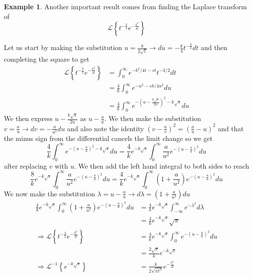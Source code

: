\documentclass{report}
\theoremstyle{definition}
\newtheorem{example}[theorem]{Example}
\theoremstyle{remark}
\newcommand{\lapt}[1]{\mathscr{L}\left\{ #1\right\}}
\newcommand{\inlt}[1]{\mathscr{L}^{-1} \left\{ #1 \right\}}
\begin{document}
\begin{example}
    Another important result comes from finding the Laplace transform of 
    \begin{equation*}
        \lapt{t^{-\frac{3}{2}}e^{-\frac{k^2}{4t}}}
    \end{equation*}
\end{example}
Let us start by making the substitution $u=\frac{k}{2\sqrt{t}} \rightarrow du =-\frac{k}{4}t^{-\frac{3}{2}}dt$ and then completing the square to get
\begin{equation*}
    \begin{split}
        \lapt{t^{-\frac{3}{2}}e^{-\frac{k^2}{4t}}} &= \int^\infty_0e^{-k^2/4t -st} t^{-3/2}dt \\
        &=\frac{4}{k}\int^\infty_0e^{-u^2-sk/4u^2}du\\
        &=\frac{4}{k}\int^\infty_0 e^{-(u-\frac{k\sqrt{s}}{2u})^2-k\sqrt{s}} du
    \end{split}
\end{equation*}
We then express $u-\frac{k\sqrt{s}}{2u}$ as $u-\frac{u}{a}$. We then make the substitution $v=\frac{a}{u} \rightarrow dv=-\frac{a}{u^2}du$ and also note the identity $(v-\frac{a}{v})^2=(\frac{a}{u}-u)^2$ and that the minus sign from the differential cancels the limit change so we get 
\begin{equation*}
    \frac{4}{k}\int^\infty_0 e^{-(u-\frac{a}{u})^2-k\sqrt{s}} du = \frac{4}{k}e^{-k\sqrt{s}}\int^\infty_0\frac{a}{u^2}e^{-(u-\frac{a}{u})^2}du
\end{equation*}
after replacing $v$ with $u$. We then add the left hand integral to both sides to reach 
\begin{equation*}
    \frac{8}{k}e^{-k\sqrt{s}}\int^\infty_0\frac{a}{u^2}e^{-(u-\frac{a}{u})^2}du = \frac{4}{k}e^{-k\sqrt{s}}\int^\infty_0\left(1+\frac{a}{u^2}\right)e^{-(u-\frac{a}{u})^2}du
\end{equation*}
We now make the substitution $\lambda =u-\frac{a}{u} \rightarrow d\lambda = \left(1+\frac{a}{u^2}\right)du$
\begin{equation*}
    \begin{split}
        \frac{4}{k}e^{-k\sqrt{s}}\int^\infty_0\left(1+\frac{a}{u^2}\right)e^{-(u-\frac{a}{u})^2}du &=\frac{4}{k}e^{-k\sqrt{s}}\int^\infty_{-\infty} e^{-\lambda^2}d\lambda \\
        &=\frac{4}{k}e^{-k\sqrt{s}}\sqrt{\pi} \\
        \Rightarrow \lapt{t^{-\frac{3}{2}}e^{-\frac{k^2}{4t}}} &=\frac{4}{k}e^{-k\sqrt{s}}\int^\infty_0e^{-(u-\frac{u}{a})^2}du\\ &= \frac{2\sqrt{\pi}}{k}e^{-k\sqrt{s}}\\
       \Rightarrow  \inlt{e^{-k\sqrt{s}}}& = \frac{k}{2\sqrt{\pi t^3}}e^{-\frac{k^2}{4t}}
    \end{split}
\end{equation*}
\end{document}
